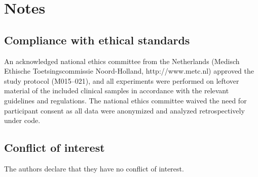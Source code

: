 \section*{Notes}

\subsection*{Compliance with ethical standards}

An acknowledged national ethics committee from the Netherlands (Medisch Ethische Toetsingscommissie Noord-Holland, http://www.metc.nl) approved the
study protocol (M015–021), and all experiments were performed on leftover material of the included clinical samples in accordance with the relevant
guidelines and regulations. The national ethics committee waived the need for participant consent as all data were anonymized and analyzed
retrospectively under code.

\subsection*{Conflict of interest}

The authors declare that they have no conflict of interest.




